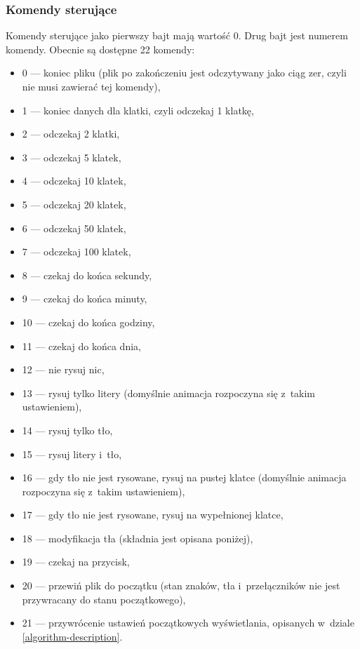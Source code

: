 \subsubsection*{Komendy sterujące}
Komendy sterujące jako pierwszy bajt mają wartość 0. Drug bajt jest numerem komendy. Obecnie są dostępne 22 komendy:
\begin{itemize}
\item 0 --- koniec pliku (plik po zakończeniu jest odczytywany jako ciąg zer, czyli nie musi zawierać tej komendy),
\item 1 --- koniec danych dla klatki, czyli odczekaj 1 klatkę,
\item 2 --- odczekaj 2 klatki,
\item 3 --- odczekaj 5 klatek,
\item 4 --- odczekaj 10 klatek,
\item 5 --- odczekaj 20 klatek,
\item 6 --- odczekaj 50 klatek,
\item 7 --- odczekaj 100 klatek,
\item 8 --- czekaj do końca sekundy,
\item 9 --- czekaj do końca minuty,
\item 10 --- czekaj do końca godziny,
\item 11 --- czekaj do końca dnia,
\item 12 --- nie rysuj nic,
\item 13 --- rysuj tylko litery (domyślnie animacja rozpoczyna się z~takim ustawieniem),
\item 14 --- rysuj tylko tło,
\item 15 --- rysuj litery i~tło,
\item 16 --- gdy tło nie jest rysowane, rysuj na pustej klatce (domyślnie animacja rozpoczyna się z~takim ustawieniem),
\item 17 --- gdy tło nie jest rysowane, rysuj na wypełnionej klatce,
\item 18 --- modyfikacja tła (składnia jest opisana poniżej),
\item 19 --- czekaj na przycisk,
\item 20 --- przewiń plik do początku (stan znaków, tła i~przełączników nie jest przywracany do stanu początkowego),
\item 21 --- przywrócenie ustawień początkowych wyświetlania, opisanych w~dziale \ref{algorithm-description}.
\end{itemize}

